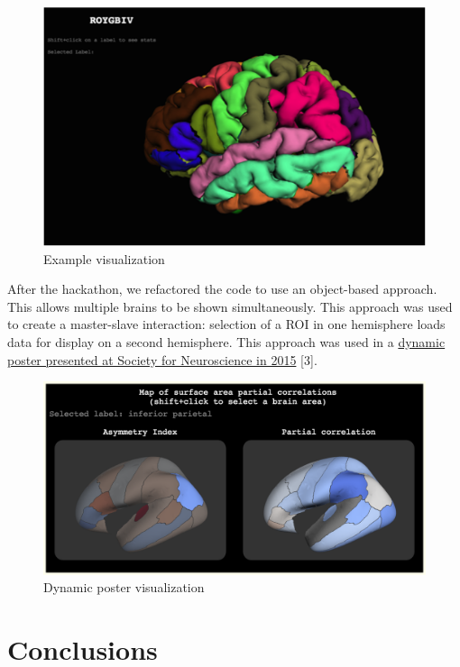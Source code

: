\documentclass[twocolumn]{bmcart}%
\begin{document}
\begin{figure}[htbp]
\centering
\includegraphics{roygbiv.png}
\caption{Example visualization}
\end{figure}

After the hackathon, we refactored the code to use an object-based
approach. This allows multiple brains to be shown simultaneously. This
approach was used to create a master-slave interaction: selection of a
ROI in one hemisphere loads data for display on a second hemisphere.
This approach was used in a
\href{http://cseweb.ucsd.edu/~bcipolli/docs/posters/SfN2015/}{dynamic
poster presented at Society for Neuroscience in 2015} {[}3{]}.

\begin{figure}[htbp]
\centering
\includegraphics{roygbiv-master-slave.png}
\caption{Dynamic poster visualization}
\end{figure}

\section{Conclusions}\label{conclusions}
\end{document}
